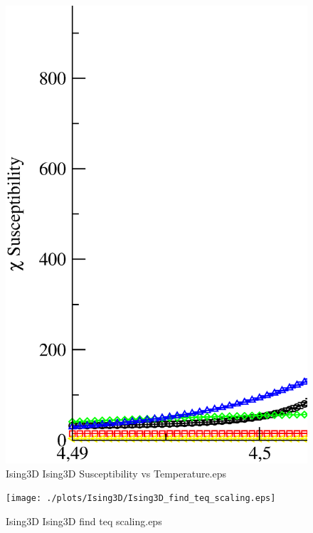 \begin{figure}[!htpb]
  \centering
  \includegraphics[width=\textwidth]{./plots/Ising3D/Ising3D_Susceptibility_vs_Temperature.eps}
  \caption{Ising3D Ising3D Susceptibility vs Temperature.eps}
\end{figure}

\begin{figure}[!htpb]
  \centering
  \texttt{[image: ./plots/Ising3D/Ising3D\_find\_teq\_scaling.eps]}
  \caption{Ising3D Ising3D find teq scaling.eps}
\end{figure}

